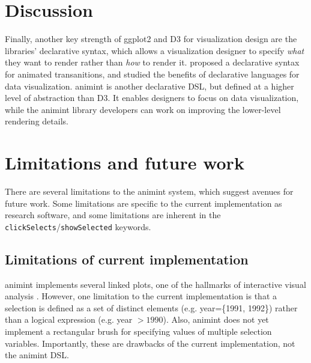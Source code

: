 \documentclass[journal]{vgtc}\usepackage[]{graphicx}\usepackage[]{color}
\begin{document}
\section{Discussion}


Finally, another key strength of ggplot2 and D3 for visualization
design are the libraries' declarative syntax, which allows a
visualization designer to specify \emph{what} they want to render
rather than \emph{how} to render it. \citet{declarative} proposed a
declarative syntax for animated transanitions, and studied the
benefits of declarative languages for data visualization. animint is
another declarative DSL, but defined at a higher level of abstraction
than D3. It enables designers to focus on data visualization, while
the animint library developers can work on improving the lower-level
rendering details.

\section{Limitations and future work}


There are several limitations to the animint system, which suggest
avenues for future work. Some limitations are specific to the current
implementation as research software, and some limitations are inherent
in the \texttt{clickSelects}/\texttt{showSelected} keywords.

\subsection{Limitations of current implementation}

animint implements several linked plots, one of the hallmarks of
interactive visual analysis \citep{iva}. However, one limitation to
the current implementation is that a selection is defined as a set of
distinct elements (e.g. year=\{1991, 1992\}) rather than a logical
expression (e.g. year $>1990$). Also, animint does not yet
implement a rectangular brush for specifying values of
multiple selection variables.
Importantly, these are drawbacks of the
current implementation, not the animint DSL.
\end{document}

